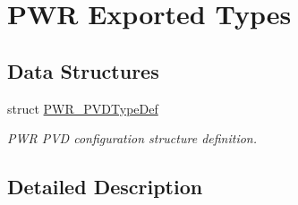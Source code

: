 \hypertarget{group___p_w_r___exported___types}{}\section{P\+WR Exported Types}
\label{group___p_w_r___exported___types}
\subsection*{Data Structures}
\begin{DoxyCompactItemize}
\item 
struct \mbox{\hyperlink{struct_p_w_r___p_v_d_type_def}{P\+W\+R\+\_\+\+P\+V\+D\+Type\+Def}}
\begin{DoxyCompactList}\small\item\em P\+WR P\+VD configuration structure definition. \end{DoxyCompactList}\end{DoxyCompactItemize}


\subsection{Detailed Description}
